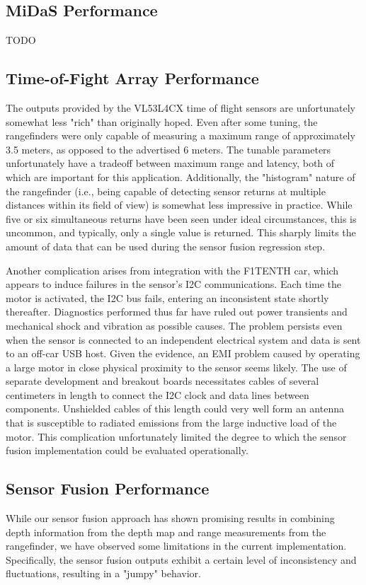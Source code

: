 \documentclass[conference]{IEEEtran}
\begin{document}
\subsection{MiDaS Performance}
TODO

\subsection{Time-of-Fight Array Performance}
The outputs provided by the VL53L4CX time of flight sensors are unfortunately
somewhat less "rich" than originally hoped. Even after some tuning, the
rangefinders were only capable of measuring a maximum range of approximately
3.5 meters, as opposed to the advertised 6 meters. The tunable parameters
unfortunately have a tradeoff between maximum range and latency, both of which
are important for this application. Additionally, the "histogram" nature of the
rangefinder (i.e., being capable of detecting sensor returns at multiple
distances within its field of view) is somewhat less impressive in practice.
While five or six simultaneous returns have been seen under ideal
circumstances, this is uncommon, and typically, only a single value is
returned. This sharply limits the amount of data that can be used during the
sensor fusion regression step.

Another complication arises from integration with the F1TENTH car, which
appears to induce failures in the sensor's I2C communications. Each time the
motor is activated, the I2C bus fails, entering an inconsistent state shortly
thereafter. Diagnostics performed thus far have ruled out power transients and
mechanical shock and vibration as possible causes. The problem persists even
when the sensor is connected to an independent electrical system and data is
sent to an off-car USB host. Given the evidence, an EMI problem caused by
operating a large motor in close physical proximity to the sensor seems likely.
The use of separate development and breakout boards necessitates cables of
several centimeters in length to connect the I2C clock and data lines between
components. Unshielded cables of this length could very well form an antenna
that is susceptible to radiated emissions from the large inductive load of the
motor. This complication unfortunately limited the degree to which the sensor
fusion implementation could be evaluated operationally.

\subsection{Sensor Fusion Performance}
While our sensor fusion approach has shown promising results in combining depth information from the depth map and range measurements from the rangefinder, we have observed some limitations in the current implementation. Specifically, the sensor fusion outputs exhibit a certain level of inconsistency and fluctuations, resulting in a "jumpy" behavior.
\end{document}
